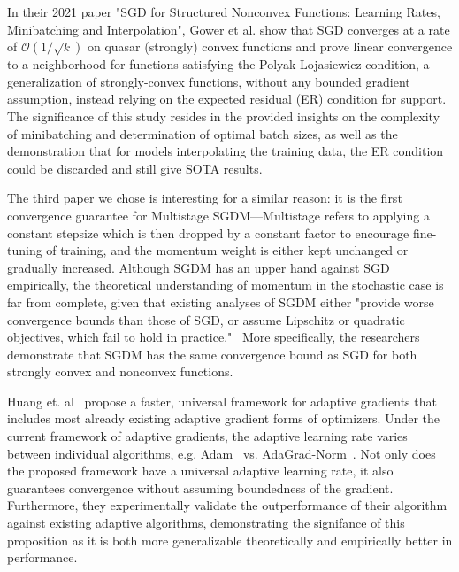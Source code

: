 \documentclass{article}
\begin{document}
In their 2021 paper "SGD for Structured Nonconvex Functions: Learning Rates, Minibatching and Interpolation", Gower et al. show that SGD converges at a rate of $\mathcal{O}(1/\sqrt{k})$
on quasar (strongly) convex functions and prove linear convergence to a neighborhood for functions satisfying the Polyak-Lojasiewicz condition, a generalization of strongly-convex functions,
without any bounded gradient assumption, instead relying on the expected residual (ER) condition for support.~\cite{https://doi.org/10.48550/arxiv.2006.10311} The significance of this study
resides in the provided insights on the complexity of minibatching and determination of optimal batch sizes, as well as the demonstration that for models interpolating the training data,
the ER condition could be discarded and still give SOTA results.

\pagebreak %

The third paper we chose is interesting for a similar reason: it is the first convergence guarantee for Multistage SGDM—Multistage refers to applying a constant stepsize
which is then dropped by a constant factor to encourage fine-tuning of training, and the momentum weight is either kept unchanged or gradually increased.
Although SGDM has an upper hand against SGD empirically, the theoretical understanding of momentum in the stochastic case is far from complete, given that existing analyses of SGDM
either "provide worse convergence bounds than those of SGD, or assume Lipschitz or quadratic objectives, which fail to hold in practice."~\cite{NEURIPS2020_d3f5d4de}
More specifically, the researchers demonstrate that SGDM has the same convergence bound as SGD for both strongly convex and nonconvex functions.

Huang et. al~\cite{https://doi.org/10.48550/arxiv.2106.08208} propose a faster, universal framework for adaptive gradients that includes most already existing
adaptive gradient forms of optimizers. Under the current framework of adaptive gradients, the adaptive learning rate varies between individual algorithms,
e.g. Adam~\cite{doi:10.1137/19M1263443} vs. AdaGrad-Norm~\cite{ward2018adagrad}. Not only does the proposed framework have a universal adaptive learning rate, it also guarantees
convergence without assuming boundedness of the gradient. Furthermore, they experimentally validate the outperformance of their algorithm against existing adaptive algorithms,
demonstrating the signifance of this proposition as it is both more generalizable theoretically and empirically better in performance.
\end{document}
